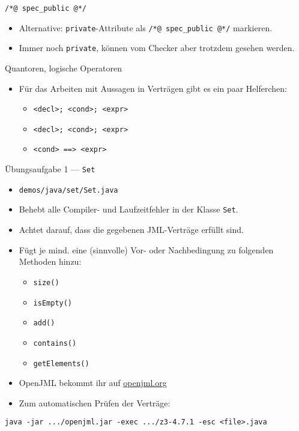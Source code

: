 \documentclass{beamer}
\begin{document}
\begin{frame}{\texttt{/*@ spec\_public @*/}}

	\begin{itemize}
		\item Alternative: \texttt{private}-Attribute als \texttt{/*@ spec\_public @*/} markieren.
		\item Immer noch \texttt{private}, können vom Checker aber trotzdem gesehen werden.
	\end{itemize}
\end{frame}

\begin{frame}{Quantoren, logische Operatoren}

	\begin{itemize}
		\item Für das Arbeiten mit Aussagen in Verträgen gibt es ein paar Helferchen:
		\begin{itemize}
			\item \texttt{\string\forall <decl>; <cond>; <expr>}
			\item \texttt{\string\exists <decl>; <cond>; <expr>}
			\item \texttt{<cond> ==> <expr>}
		\end{itemize}
	\end{itemize}
\end{frame}

\begin{frame}{Übungsaufgabe 1 --- \texttt{Set}}
	\begin{itemize}
		\item \texttt{demos/java/set/Set.java}
		\item Behebt alle Compiler- und Laufzeitfehler in der Klasse \texttt{Set}.
		\pause
		\item Achtet darauf, dass die gegebenen JML-Verträge erfüllt sind.
		\pause
		\item Fügt je mind. eine (sinnvolle) Vor- oder Nachbedingung zu folgenden Methoden hinzu:
		\begin{itemize}
			\item \texttt{size()}
			\item \texttt{isEmpty()}
			\item \texttt{add()}
			\item \texttt{contains()}
			\item \texttt{getElements()}
		\end{itemize}
	\end{itemize}

        \vfill

        \begin{itemize}
          \item OpenJML bekommt ihr auf \href{https://openjml.org}{openjml.org}
          \item Zum automatischen Prüfen der Verträge:
        \end{itemize}
        \footnotesize
        \texttt{java -jar .../openjml.jar -exec .../z3-4.7.1 -esc <file>.java}
\end{frame}
\end{document}
